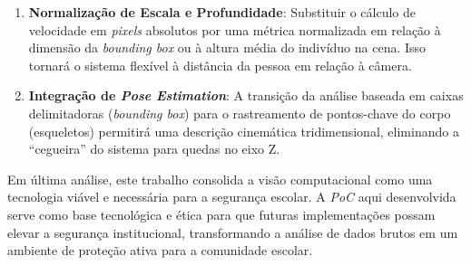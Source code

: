 \documentclass[12pt]{article}
\begin{document}
\begin{enumerate}

    \item \textbf{Normalização de Escala e Profundidade}: Substituir o cálculo de velocidade em \textit{pixels}
    absolutos por uma métrica normalizada em relação à dimensão da \textit{bounding box} ou à altura média do
    indivíduo na cena. Isso tornará o sistema flexível à distância da pessoa em relação à câmera.
    \\
    \item \textbf{Integração de \textit{Pose Estimation}}: A transição da análise baseada em caixas delimitadoras 
    (\textit{bounding box}) para o rastreamento de pontos-chave do corpo (esqueletos) permitirá uma descrição
    cinemática tridimensional, eliminando a ``cegueira'' do sistema para quedas no eixo Z.
    
\end{enumerate}

Em última análise, este trabalho consolida a visão computacional como uma tecnologia viável e necessária 
para a segurança escolar. A \textit{PoC} aqui desenvolvida serve como base tecnológica e ética para que
futuras implementações possam elevar a segurança institucional, transformando a análise de dados brutos
em um ambiente de proteção ativa para a comunidade escolar.

\raggedright


\end{document}
